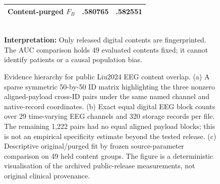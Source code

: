 \begin{figure}[tb]
\begin{minipage}[t]{.46\linewidth}
{\begin{tabular}{@{}lcc@{}}
Content-purged $F_B$ & .580765 & .582551\\
\bottomrule
\end{tabular}}\\[7pt]
{\small\textbf{Interpretation:} Only released digital contents are
fingerprinted. The AUC comparison holds 49 evaluated contents fixed;
it cannot identify patients or a causal population bias.}
\end{minipage}
\caption{Evidence hierarchy for public Liu2024 EEG content overlap.
(a) A sparse symmetric 50-by-50 ID matrix highlighting the three
nonzero aligned-payload cross-ID pairs under the same named channel
and native-record coordinates. (b) Exact equal digital EEG block
counts over 29 time-varying EEG channels and 320 storage records
per file. The remaining 1,222 pairs had no equal aligned payload
blocks; this is not an empirical specificity estimate beyond
the tested release. (c) Descriptive original/purged fit by frozen
source-parameter comparison on 49 held content groups.
The figure is a deterministic visualisation of the archived
public-release measurements, not original clinical provenance.}
\label{fig:p2-native-evidence-matrix}
\end{figure}
